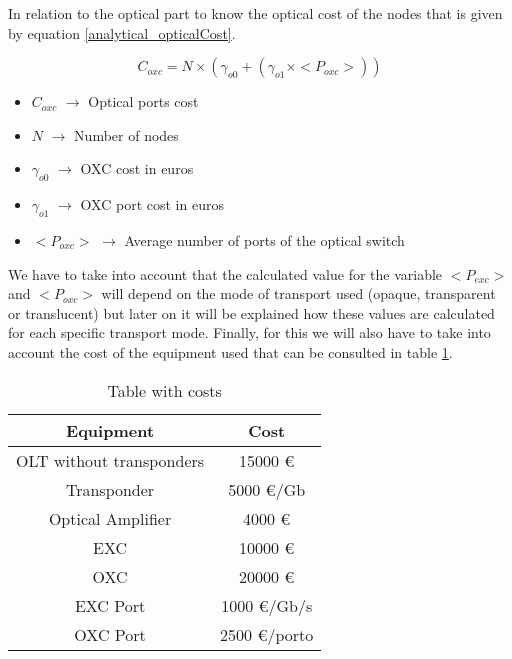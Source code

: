 \vspace{11pt}
In relation to the optical part to know the optical cost of the nodes that is given by equation \ref{analytical_opticalCost}.

\begin{equation}
C_{oxc} = N \times \left( \gamma_{o0} + \left( \gamma_{o1} \times <P_{oxc}> \right) \right)
\label{analytical_opticalCost}
\end{equation}


\begin{itemize}
\item{$C_{oxc}$		$\rightarrow$	Optical ports cost}
\item{$N$			$\rightarrow$	Number of nodes}
\item{$\gamma_{o0}$	$\rightarrow$	OXC cost in euros}
\item{$\gamma_{o1}$	$\rightarrow$	OXC port cost in euros}
\item{$<P_{oxc}>$   $\rightarrow$   Average number of ports of the optical switch}
\end{itemize}

\vspace{10pt}
We have to take into account that the calculated value for the variable $<P_{exc}>$ and $<P_{oxc}>$ will depend on the mode of transport used (opaque, transparent or translucent) but later on it will be explained how these values are calculated for each specific transport mode.
Finally, for this we will also have to take into account the cost of the equipment used that can be consulted in table \ref{table_cost_analytical}.\\

\begin{table}[h!]
\centering
\begin{tabular}{|| c | c||}
 \hline
 Equipment & Cost \\
 \hline\hline
 OLT without transponders & 15000 \euro \\
 Transponder & 5000 \euro/Gb \\
 Optical Amplifier & 4000 \euro \\
 EXC & 10000 \euro \\
 OXC & 20000 \euro \\
 EXC Port & 1000 \euro /Gb/s\\
 OXC Port & 2500 \euro /porto \\
 \hline
\end{tabular}
\caption{Table with costs}
\label{table_cost_analytical}
\end{table}

